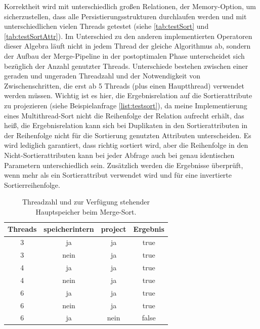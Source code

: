 \documentclass[a4paper,12pt,twoside]{article}
\begin{document}
{Korrektheit wird mit unterschiedlich großen Relationen, der Memory-Option, um sicherzustellen, dass alle Persistierungsstrukturen durchlaufen werden und mit unterschiedlichen vielen Threads getestet (siehe \autoref{tab:testSort} und \autoref{tab:testSortAttr}). Im Unterschied zu den anderen implementierten Operatoren dieser Algebra läuft nicht in jedem Thread der gleiche Algorithmus ab, sondern der Aufbau der Merge-Pipeline in der postoptimalen Phase unterscheidet sich bezüglich der Anzahl genutzter Threads. Unterschiede bestehen zwischen einer geraden und ungeraden Threadzahl und der Notwendigkeit von Zwischenschritten, die erst ab 5 Threads (plus einen Hauptthread) verwendet werden müssen. Wichtig ist es hier, die Ergebnisrelation auf die Sortierattribute zu projezieren (siehe Beispielanfrage \autoref{list:testsort}), da meine Implementierung eines Multithread-Sort nicht die Reihenfolge der Relation aufrecht erhält, das heiß, die Ergebnisrelation kann sich bei Duplikaten in den Sortierattributen in der Reihenfolge nicht für die Sortierung genutzten Attributen unterscheiden. Es wird lediglich garantiert, dass richtig sortiert wird, aber die Reihenfolge in den Nicht-Sortierattributen kann bei jeder Abfrage auch bei genau identischen Parametern unterschiedlich sein. Zusätzlich werden die Ergebnisse überprüft, wenn mehr als ein Sortierattribut verwendet wird und für eine invertierte Sortierreihenfolge.

\begin{table}
	\centering
\begin{tabular}{|c|c|c|c|}
	\hline 
	Threads\footnotemark & speicherintern & project & Ergebnis \\ 
	\hline 
	3 & ja & ja & true \\ 
	\hline 
	3 & nein & ja & true \\ 
	\hline 
	4 & ja & ja & true \\ 
	\hline 
	4 & nein & ja  & true \\ 
	\hline 
	6 & ja & ja & true \\ 
	\hline
	6 & nein & ja & true \\ 
	\hline
	6 & ja & nein & false \\ 
	\hline 
\end{tabular}
\caption{\label{tab:testSort} Threadzahl und zur Verfügung stehender Hauptspeicher beim Merge-Sort.}
\end{table}


}
\end{document}
